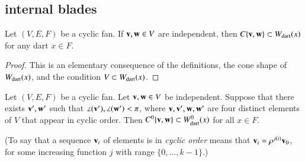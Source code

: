 \subsection{internal blades}


\begin{lemma}  Let $(V,E,F)$ be a cyclic fan.   If ${\mathbf v},{\mathbf w}\in V$ are independent, then $C\{{\mathbf v},{\mathbf w}\} \subset W_{\text{dart}}(x)$ for any dart $x\in F$.
\end{lemma}
%

\begin{proof}  This is an elementary consequence of the definitions, the cone shape of $W_{\text{dart}}(x)$,  and the condition $V\subset W_{\text{dart}}(x)$.
\end{proof}


\begin{lemma}  \label{lemma:internal}
Let $(V,E,F)$ be a cyclic fan. 
Let ${\mathbf v},{\mathbf w}\in V$ be independent.  Suppose that there exists ${\mathbf v}',{\mathbf w}'$ such
that $\angle({\mathbf v}'),\angle({\mathbf w}')<\pi$, where ${\mathbf v},{\mathbf v}',{\mathbf w},{\mathbf w}'$ are four distinct elements of
$V$ that appear in cyclic order.
Then $C^0\{{\mathbf v},{\mathbf w}\}\subset W^0_{\text{dart}}(x)$ for all $x\in F$.
\end{lemma}
%
%
%

(To say that a sequence ${\mathbf v}_i$ of elements is in {\it cyclic order} means that
${\mathbf v}_i = \rho^{j (i)}{\mathbf v}_0$, for some increasing function $j$ with range $\{0,\ldots,k-1\}$.)

